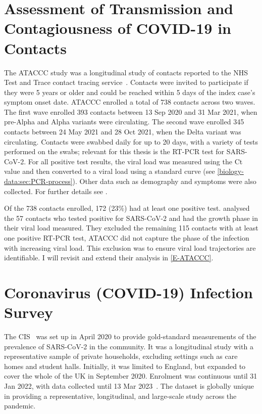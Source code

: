 \documentclass[thesis.tex]{subfiles}
\begin{document}
\section{Assessment of Transmission and Contagiousness of COVID-19 in Contacts} \label{biology-data:sec:ataccc}

The ATACCC study was a longitudinal study of contacts reported to the NHS Test and Trace contact tracing service~\autocite{hakkiOnset}.
Contacts were invited to participate if they were 5 years or older and  could be reached within 5 days of the index case's symptom onset date.
ATACCC enrolled a total of 738 contacts across two waves.
The first wave enrolled 393 contacts between 13 Sep 2020 and 31 Mar 2021, when pre-Alpha and Alpha variants were circulating.
The second wave enrolled 345 contacts between 24 May 2021 and 28 Oct 2021, when the Delta variant was circulating.
Contacts were swabbed daily for up to 20 days, with a variety of tests performed on the swabs; relevant for this thesis is the RT-PCR test for SARS-CoV-2.
For all positive test results, the viral load was measured using the Ct value and then converted to a viral load using a standard curve (see \cref{biology-data:sec:PCR-process}).
Other data such as demography and symptoms were also collected.
For further details see \textcite{singanayagamDuration,hakkiOnset}.

Of the 738 contacts enrolled, 172 (23\%) had at least one positive test.
\Textcite{hakkiOnset} analysed the 57 contacts who tested positive for SARS-CoV-2 and had the growth phase in their viral load measured.
They excluded the remaining 115 contacts with at least one positive RT-PCR test, ATACCC did not capture the phase of the infection with increasing viral load.
This exclusion was to ensure viral load trajectories are identifiable.
I will revisit and extend their analysis in \cref{E-ATACCC}.

\section{Coronavirus (COVID-19) Infection Survey} \label{intro:sec:cis}

The CIS~\autocite{CIS} was set up in April 2020 to provide gold-standard measurements of the prevalence of SARS-CoV-2 in the community.
It was a longitudinal study with a representative sample of private households, \ie excluding settings such as care homes and student halls.
Initially, it was limited to England, but expanded to cover the whole of the UK in September 2020.
Enrolment was continuous until 31 Jan 2022, with data collected until 13 Mar 2023~\autocite{weiRisk}. 
The dataset is globally unique in providing a representative, longitudinal, and large-scale study across the pandemic.
\end{document}
